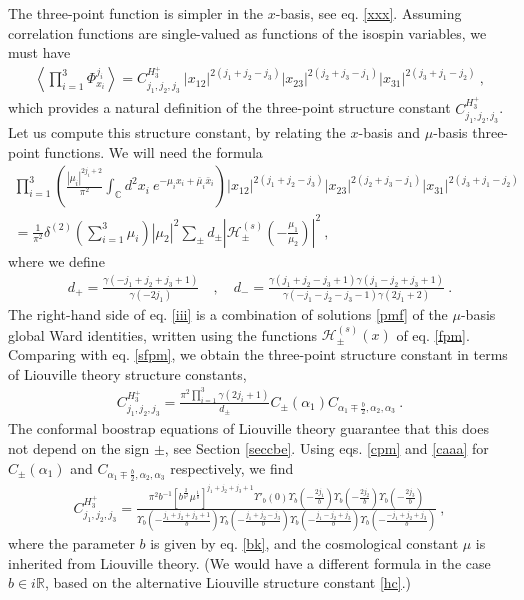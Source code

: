 \documentclass[12pt, a4paper, notitlepage, twoside]{report}
\numberwithin{equation}{section}
\theoremstyle{break}
\begin{document}
The three-point function is simpler in the $x$-basis, see eq. \eqref{xxx}.
Assuming correlation functions are single-valued as functions of the isospin variables, we must have
\begin{align}
  \left\langle \prod_{i=1}^3 \Phi^{j_i}_{x_i} \right\rangle = C^{H_3^+}_{j_1,j_2,j_3}\ |x_{12}|^{2(j_1+j_2-j_3)} |x_{23}|^{2(j_2+j_3-j_1)} |x_{31}|^{2(j_3+j_1-j_2)}\ ,
\label{ch}
\end{align}
which provides a natural definition of the three-point structure constant $C^{H_3^+}_{j_1,j_2,j_3}$.
Let us compute this structure constant, by relating the $x$-basis and $\mu$-basis three-point functions. We will need the formula \cite{rt05}
\begin{multline}
 \prod_{i=1}^3\left(\frac{|\mu_i|^{2j_i+2}}{\pi^2}\int_{{\mathbb{C}}}d^2x_i\ e^{-\mu_ix_i+\bar{\mu}_i\bar{x}_i}\right)
|x_{12}|^{2(j_1+j_2-j_3)} |x_{23}|^{2(j_2+j_3-j_1)} |x_{31}|^{2(j_3+j_1-j_2)} 
\\
= \frac{1}{\pi^2}\delta^{(2)}(\textstyle{\sum}_{i=1}^3\mu_i)|\mu_2|^2 \sum_\pm d_\pm \left|\mathcal{H}^{(s)}_\pm(-\tfrac{\mu_1}{\mu_2})\right|^2 \ ,
\label{iii}
\end{multline}
where we define 
\begin{align}
 d_+ = \frac{\gamma(-j_1+j_2+j_3+1)}{\gamma(-2j_1)} \quad , \quad d_- = \frac{\gamma(j_1+j_2-j_3+1)\gamma(j_1-j_2+j_3+1)}{\gamma(-j_1-j_2-j_3-1)\gamma(2j_1+2)}\ .
\end{align}
The right-hand side of eq. \eqref{iii} is a combination of solutions \eqref{pmf} of the $\mu$-basis global Ward identities, written using the functions $\mathcal{H}^{(s)}_\pm(x)$ of eq. \eqref{fpm}.
Comparing with eq. \eqref{sfpm}, we obtain the three-point structure constant in terms of Liouville theory structure constants,
\begin{align}
 C^{H_3^+}_{j_1,j_2,j_3} = \frac{\pi^2\prod_{i=1}^3\gamma(2j_i+1)}{d_\pm}C_{\pm}(\alpha_1)C_{\alpha_1\mp \frac{b}{2},\alpha_2,\alpha_3}\ .
\end{align}
The conformal boostrap equations of Liouville theory guarantee that this does not depend on the sign $\pm$, see Section \ref{seccbe}.
Using eqs. \eqref{cpm} and \eqref{caaa} for $C_{\pm}(\alpha_1)$ and $C_{\alpha_1\mp \frac{b}{2},\alpha_2,\alpha_3}$ respectively, we find
\begin{align}
\boxed{C^{H_3^+}_{j_1,j_2,j_3} = \frac{\pi^2b^{-1}\left[b^{\frac{2}{b^2}}\mu^{\frac{1}{b}}\right]^{j_1+j_2+j_3+1} \Upsilon'_b(0)\Upsilon_b(-\frac{2j_1}{b})\Upsilon_b(-\frac{2j_2}{b})\Upsilon_b(-\frac{2j_3}{b})}
{\Upsilon_b(-\frac{j_1+j_2+j_3+1}{b})\Upsilon_b(-\frac{j_1+j_2-j_3}{b}) \Upsilon_b(-\frac{j_1-j_2+j_3}{b})\Upsilon_b(-\frac{-j_1+j_2+j_3}{b})}}\ ,
\label{chp}
\end{align}
where the parameter $b$ is given by eq. \eqref{bk}, and the cosmological constant $\mu$ is inherited from Liouville theory.
(We would have a different formula in the case $b\in i\mathbb{R}$, based on the alternative Liouville structure constant \eqref{hc}.)
\end{document}

